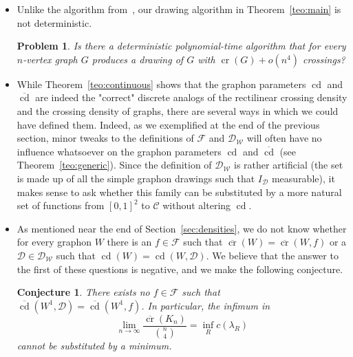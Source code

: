 \documentclass{article}
\newcounter{contSect} \numberwithin{contSect}{section}
\newtheorem{conjecture}[contSect]{Conjecture}
\newtheorem{problem}[contSect]{Problem}
\begin{document}
\begin{itemize}
    \item Unlike the algorithm from~\cite{approximatingrect}, our drawing algorithm in Theorem~\ref{teo:main} is not deterministic.

\begin{problem}
    Is there a deterministic polynomial-time algorithm that for every $n$-vertex graph $G$ produces a drawing of $G$ with $\mathop{\mathrm{cr}}(G)+o(n^4)$ crossings?
\end{problem}

\item While Theorem~\ref{teo:continuous} shows that the graphon parameters $\mathop{\mathrm{cd}}$ and $\overline{\mathop{\mathrm{cd}}}$ are indeed the "correct" discrete analogs of the rectilinear crossing density and the crossing density of graphs, there are several ways in which we could have defined them. Indeed, as we exemplified at the end of the previous section, minor tweaks to the definitions of $\mathcal{F}$ and $\mathcal{D}_\mathcal{W}$ will often have no influence whatsoever on the graphon parameters $\mathop{\mathrm{cd}}$ and $\overline{\mathop{\mathrm{cd}}}$ (see Theorem~\ref{teo:generic}). Since the definition of $\mathcal{D}_\mathcal{W}$ is rather artificial (the set is made up of all the simple graphon drawings such that $I_\mathcal{D}$ measurable), it makes sense to ask whether this family can be substituted by a more natural set of functions from $[0,1]^2$ to $\mathcal{C}$ without altering $\mathop{\mathrm{cd}}$.

\item As mentioned near the end of Section~\ref{sec:densities}, we do not know whether for every graphon $W$ there is an $f\in\mathcal{F}$ such that $\overline{\mathop{\mathrm{cr}}}(W)=\overline{\mathop{\mathrm{cr}}}(W,f)$ or a $\mathcal{D}\in\mathcal{D}_\mathcal{W}$ such that $\mathop{\mathrm{cd}}(W)=\mathop{\mathrm{cd}}(W,\mathcal{D})$. We believe that the answer to the first of these questions is negative, and we make the following conjecture.

\begin{conjecture}
    There exists no $f\in \mathcal F$ such that $\overline{\mathop{\mathrm{cd}}}(W^1,\mathcal{D})=\overline{\mathop{\mathrm{cd}}}(W^1,f)$. In particular, the infimum in \[\lim_{n\rightarrow\infty}\frac{\overline{\mathop{\mathrm{cr}}}(K_n)}{\binom{n}{4}}=\inf_{R}c(\lambda_R)\] cannot be substituted by a minimum.
\end{conjecture}


\end{itemize}
\end{document}
